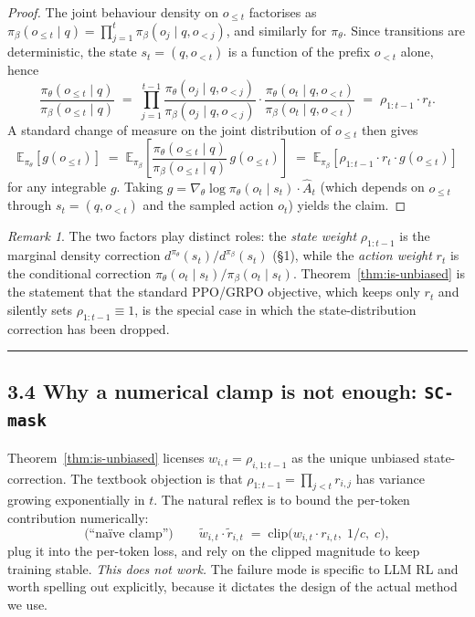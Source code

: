 \documentclass[11pt,a4paper]{article}
\theoremstyle{remark}
\newtheorem*{remark}{Remark}
\begin{document}
\begin{proof}
The joint behaviour density on $o_{\le t}$ factorises as $\pi_\beta(o_{\le t}\mid q)=\prod_{j=1}^{t}\pi_\beta(o_j\mid q,o_{<j})$, and similarly for $\pi_\theta$. Since transitions are deterministic, the state $s_t=(q,o_{<t})$ is a function of the prefix $o_{<t}$ alone, hence
\begin{equation*}
\frac{\pi_\theta(o_{\le t}\mid q)}{\pi_\beta(o_{\le t}\mid q)}
\;=\;\prod_{j=1}^{t-1}\frac{\pi_\theta(o_j\mid q,o_{<j})}{\pi_\beta(o_j\mid q,o_{<j})}\cdot\frac{\pi_\theta(o_t\mid q,o_{<t})}{\pi_\beta(o_t\mid q,o_{<t})}
\;=\;\rho_{1:t-1}\cdot r_t .
\end{equation*}
A standard change of measure on the joint distribution of $o_{\le t}$ then gives
\begin{equation*}
\mathbb E_{\pi_\theta}\!\left[g(o_{\le t})\right]
\;=\;\mathbb E_{\pi_\beta}\!\left[\frac{\pi_\theta(o_{\le t}\mid q)}{\pi_\beta(o_{\le t}\mid q)}\,g(o_{\le t})\right]
\;=\;\mathbb E_{\pi_\beta}\!\left[\rho_{1:t-1}\cdot r_t\cdot g(o_{\le t})\right]
\end{equation*}
for any integrable $g$. Taking $g=\nabla_\theta\log\pi_\theta(o_t\mid s_t)\cdot \hat A_t$ (which depends on $o_{\le t}$ through $s_t=(q,o_{<t})$ and the sampled action $o_t$) yields the claim.
\end{proof}

\begin{remark}
The two factors play distinct roles: the \emph{state weight} $\rho_{1:t-1}$ is the marginal density correction $d^{\pi_\theta}(s_t)/d^{\pi_\beta}(s_t)$ (§1), while the \emph{action weight} $r_t$ is the conditional correction $\pi_\theta(o_t\mid s_t)/\pi_\beta(o_t\mid s_t)$. Theorem~\ref{thm:is-unbiased} is the statement that the standard PPO/GRPO objective, which keeps only $r_t$ and silently sets $\rho_{1:t-1}\equiv 1$, is the special case in which the state-distribution correction has been dropped.
\end{remark}

\vspace{0.5em}\hrule\vspace{0.5em}
\subsection*{3.4 Why a numerical clamp is not enough: \texttt{SC-mask}}

Theorem~\ref{thm:is-unbiased} licenses $w_{i,t}=\rho_{i,1:t-1}$ as the unique unbiased state-correction. The textbook objection is that $\rho_{1:t-1}=\prod_{j<t}r_{i,j}$ has variance growing exponentially in $t$. The natural reflex is to bound the per-token contribution numerically:
\[
\text{(``naïve clamp'')}\qquad
\tilde w_{i,t}\!\cdot\!\tilde r_{i,t} \;=\; \mathrm{clip}\!\big(w_{i,t}\!\cdot\! r_{i,t},\;1/c,\;c\big),
\]
plug it into the per-token loss, and rely on the clipped magnitude to keep training stable. \emph{This does not work.} The failure mode is specific to LLM RL and worth spelling out explicitly, because it dictates the design of the actual method we use.
\end{document}

